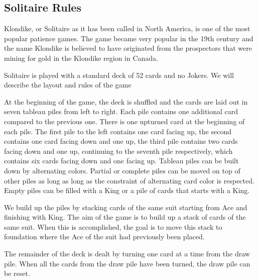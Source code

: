 \documentclass[runningheads,a4paper]{llncs}
\begin{document}
\subsection{Solitaire Rules}
\label{sec1:solitaire_rules}
Klondike, or Solitaire as it has been called in North America, is one of the most popular patience games.
\newline
 The game became very popular in the 19th century and the name Klondike is believed to have originated from the prospectors that were mining for gold in the Klondike region in Canada.
 \newline
 
Solitaire is played with a standard deck of 52 cards and no Jokers.
We will describe the layout and rules of the game 
\newline

 At the beginning of the game, the deck is shuffled and the cards are laid out in seven tableau piles from left to right. Each pile contains one additional card compared to the previous one. 
 There is one upturned card at the beginning of each pile. The first pile to the left contains one card facing up, the second contains one card facing down and one up, the third pile contains two cards facing down and one up, continuing to the seventh pile respectively, which contains six cards facing down and one facing up.
 Tableau piles can be built down by alternating colors. Partial or complete piles can be moved on top of other piles as long as long as the constraint of alternating card color is respected. 
 Empty piles can be filled with a King or a pile of cards that starts with a King.
\newline
 
We build up the piles by stacking cards of the same suit starting from Ace and finishing with King. The aim of the game is to build up a stack of cards of the same suit. When this is accomplished, the goal is to move this stack to foundation where the Ace of the suit had previously been placed. 
\newline
  
The remainder of the deck is dealt by turning one card at a time from the draw pile.
When all the cards from the draw pile have been turned, the draw pile can be reset. 
 
\end{document}
